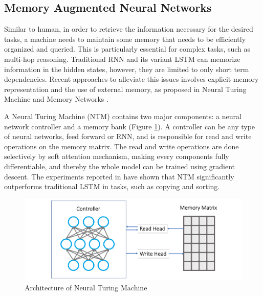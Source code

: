 \documentclass[journal]{IEEEtran}
\begin{document}
\subsection{Memory Augmented Neural Networks}
Similar to human, in order to retrieve the information necessary for the desired tasks, a machine needs to maintain some memory that needs to be efficiently organized and queried. 
This is particularly essential for complex tasks, such as multi-hop reasoning. Traditional RNN and its variant LSTM can memorize information in the hidden states,
however, they are limited to only short term dependencies. Recent approaches to alleviate this issues involves explicit memory representation and the use of external memory, 
as proposed in Neural Turing Machine \cite{graves2014neural} and Memory Networks \cite{weston2014memory}. 

A Neural Turing Machine (NTM) contains two major components: a neural network controller and a memory bank (Figure \ref{NTM}). 
A controller can be any type of neural networks, feed forward or RNN, and is responsible for read and write operations on the memory matrix.
The read and write operations are done selectively by soft attention mechanism, making every components fully differentiable, 
and thereby the whole model can be trained using gradient descent. The experiments reported in \cite{graves2014neural} have shown that NTM significantly
outperforms traditional LSTM in tasks, such as copying and sorting.

\begin{figure}[htb]
  \centering
  \includegraphics[width=0.8\columnwidth]{NTM.png}
  \caption{Architecture of Neural Turing Machine}
  \label{NTM}
\end{figure}
\end{document}
